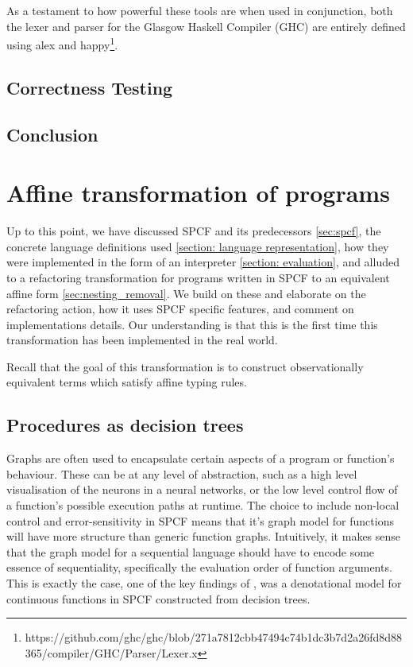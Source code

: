 \documentclass[12pt,a4paper]{report}
\theoremstyle{definition}
\theoremstyle{remark}
\begin{document}
As a testament to how powerful these tools are when used in conjunction, both the lexer and parser for the Glasgow Haskell Compiler (GHC) are entirely defined using alex and happy\footnote{https://github.com/ghc/ghc/blob/271a7812cbb47494c74b1dc3b7d2a26fd8d88365/compiler/GHC/Parser/Lexer.x}. 

\section{Correctness Testing}
\section{Conclusion}

\chapter{Affine transformation of programs}\label{chapter: denesting}
Up to this point, we have discussed SPCF and its predecessors \ref{sec:spcf}, the concrete language definitions used \ref{section: language representation}, how they were implemented in the form of an interpreter \ref{section: evaluation}, and alluded to a refactoring transformation for programs written in SPCF to an equivalent affine form \ref{sec:nesting_removal}. We build on these and elaborate on the refactoring action, how it uses SPCF specific features, and comment on implementations details. Our understanding is that this is the first time this transformation has been implemented in the real world. 

Recall that the goal of this transformation is to construct observationally equivalent terms which satisfy affine typing rules. 

\section{Procedures as decision trees}
Graphs are often used to encapsulate certain aspects of a program or function's behaviour. These can be at any level of abstraction, such as a high level visualisation of the neurons in a neural networks, or the low level control flow of a function's possible execution paths at runtime. The choice to include non-local control and error-sensitivity in SPCF means that it's graph model for functions will have more structure than generic function graphs. Intuitively, it makes sense that the graph model for a sequential language should have to encode some essence of sequentiality, specifically the evaluation order of function arguments. This is exactly the case, one of the key findings of \cite{cartwright_1992}, was a denotational model for continuous functions in SPCF constructed from decision trees. 
\end{document}
